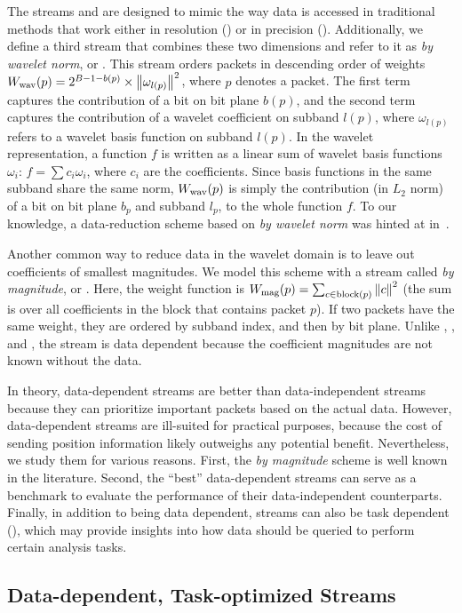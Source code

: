 The streams \slvl and \sbit are designed to mimic the way data is accessed in traditional methods
that work either in resolution (\slvl) or in precision (\sbit). Additionally, we define a third
stream that combines these two dimensions and refer to it as \emph{by wavelet norm}, or \swav. This
stream orders packets in descending order of weights $\wwav(p)=2^{B-1-b(p)}\times
\norm{\omega_{l(p)}}^2$, where $p$ denotes a packet. The first term captures the contribution of a
bit on bit plane $b(p)$, and the second term captures the contribution of a wavelet coefficient on
subband $l(p)$, where $\omega_{l(p)}$ refers to a wavelet basis function on subband $l(p)$. In the
wavelet representation, a function $f$ is written as a linear sum of wavelet basis functions
$\omega_i$: $f=\sum{c_i\omega_i}$, where $c_i$ are the coefficients. Since basis functions in the
same subband share the same norm, $\wwav(p)$ is simply the contribution (in $L_2$ norm) of a bit on
bit plane $b_p$ and subband $l_p$, to the whole function $f$. To our knowledge, a data-reduction
scheme based on \emph{by wavelet norm} was hinted at in~\cite{weiss}.

Another common way to reduce data in the wavelet domain is to leave out coefficients of smallest
magnitudes. We model this scheme with a stream called \emph{by magnitude}, or \smag. Here, the
weight function is $\wmag(p)=\sum_{c\in \text{block}(p)}\norm{c}^2$ (the sum is over all
coefficients in the block that contains packet $p$). If two packets have the same weight, they are
ordered by subband index, and then by bit plane. Unlike \slvl, \sbit, and \swav, the \smag stream is
data dependent because the coefficient magnitudes are not known without the data.

In theory, data-dependent streams are better than data-independent streams because they can
prioritize important packets based on the actual data. However, data-dependent streams are
ill-suited for practical purposes, because the cost of sending position information likely outweighs
any potential benefit. Nevertheless, we study them for various reasons. First, the \emph{by
magnitude} scheme is well known in the literature. Second, the ``best'' data-dependent streams can
serve as a benchmark to evaluate the performance of their data-independent counterparts. Finally, in
addition to being data dependent, streams can also be task dependent (),
which may provide insights into how data should be queried to perform certain analysis tasks.

\subsection{Data-dependent, Task-optimized Streams} \label{sec:data_dep_streams}

